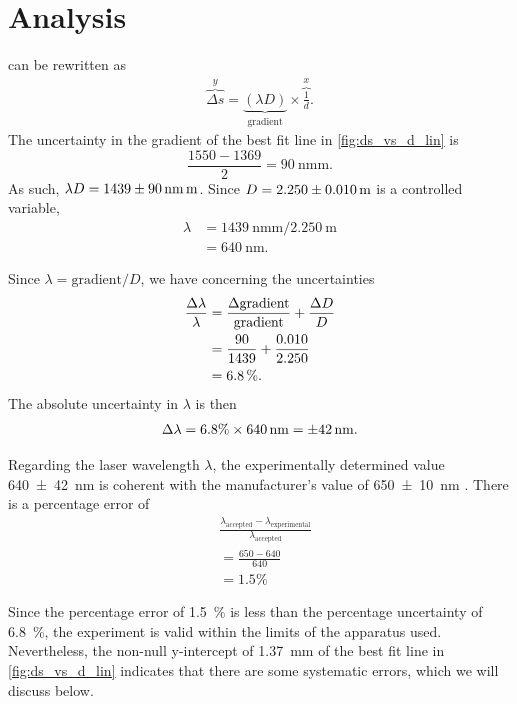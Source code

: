 \documentclass[a4paper, 12pt]{article}
\begin{document}
\section{Analysis}
 can be rewritten as
\begin{align}
    \overbrace{\Delta s}^{y} 
    = 
    \underbrace{(\lambda D)}_{\text{gradient}} \times \overbrace{\frac{1}{d}}^{x}.
\end{align}
The uncertainty in the gradient of the best fit line in \cref{fig:ds_vs_d_lin} is \[\frac{1550 - 1369}{2} = \SI{90}{\nm \m}.\]
As such, $\lambda D = \SI{1439+-90}{\nm\m}$.
Since $D = \SI{2.250+-0.010}{\m}$ is a controlled variable,
\begin{align*}
    \lambda 
    &= \SI{1439}{\nm\m} / \SI{2.250}{\m}\\
    &= \SI{640}{\nm}
    .
\end{align*}

Since $\lambda = \text{gradient} / D$, we have concerning the uncertainties
\begin{align*}
    \frac{\Delta\lambda}{\lambda} &= \frac{\Delta\text{gradient}}{\text{gradient}} + \frac{\Delta D}{D}\\
    &= \frac{90}{1439} + \frac{0.010}{2.250}\\
    &= \SI{6.8}{\%}.
\end{align*}
The absolute uncertainty in $\lambda$ is then
\begin{align*}
    \Delta \lambda = 6.8\% \times \SI{640}{\nm} = \SI{+-42}{\nm}.
\end{align*}

Regarding the laser wavelength $\lambda$, the experimentally determined value \SI{640+-42}{\nm} is coherent with the manufacturer's value of \SI{650+-10}{\nm} \autocite{laser-specs}.
There is a percentage error of 
\begin{align*}
    &\frac{\lambda_\text{accepted} - \lambda_\text{experimental}}{\lambda_\text{accepted}}\\
    &= \frac{650 - 640}{640}\\
    &= 1.5\%
\end{align*}

Since the percentage error of \SI{1.5}{\%} is less than the percentage uncertainty of \SI{6.8}{\%}, the experiment is valid within the limits of the apparatus used.
Nevertheless, the non-null y-intercept of \SI{+1.37}{\mm} of the best fit line in \cref{fig:ds_vs_d_lin} indicates that there are some systematic errors, which we will discuss below.
\end{document}
